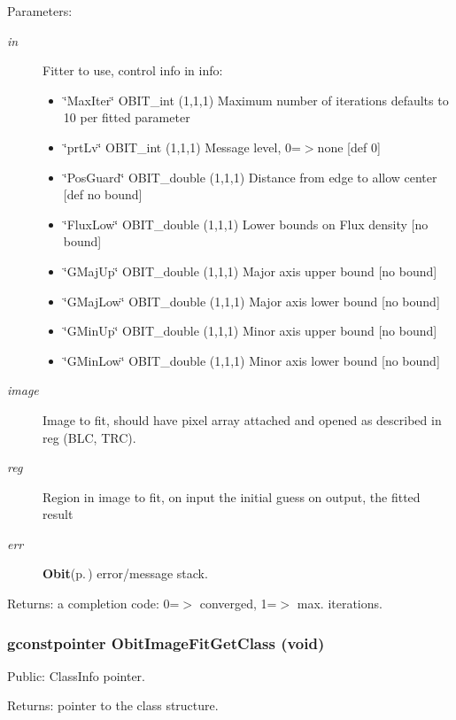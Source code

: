 \begin{Desc}
\item[Parameters:]
\begin{description}
\item[{\em in}]Fitter to use, control info in info: \begin{itemize}
\item \char`\"{}Max\-Iter\char`\"{} OBIT\_\-int (1,1,1) Maximum number of iterations defaults to 10 per fitted parameter \item \char`\"{}prt\-Lv\char`\"{} OBIT\_\-int (1,1,1) Message level, 0=$>$none [def 0] \item \char`\"{}Pos\-Guard\char`\"{} OBIT\_\-double (1,1,1) Distance from edge to allow center [def no bound] \item \char`\"{}Flux\-Low\char`\"{} OBIT\_\-double (1,1,1) Lower bounds on Flux density [no bound] \item \char`\"{}GMaj\-Up\char`\"{} OBIT\_\-double (1,1,1) Major axis upper bound [no bound] \item \char`\"{}GMaj\-Low\char`\"{} OBIT\_\-double (1,1,1) Major axis lower bound [no bound] \item \char`\"{}GMin\-Up\char`\"{} OBIT\_\-double (1,1,1) Minor axis upper bound [no bound] \item \char`\"{}GMin\-Low\char`\"{} OBIT\_\-double (1,1,1) Minor axis lower bound [no bound] \end{itemize}
\item[{\em image}]Image to fit, should have pixel array attached and opened as described in reg (BLC, TRC). \item[{\em reg}]Region in image to fit, on input the initial guess on output, the fitted result \item[{\em err}]{\bf Obit}{\rm (p.\,\pageref{structObit})} error/message stack. \end{description}
\end{Desc}
\begin{Desc}
\item[Returns:]a completion code: 0=$>$ converged, 1=$>$ max. iterations. \end{Desc}
\subsubsection{\setlength{\rightskip}{0pt plus 5cm}gconstpointer Obit\-Image\-Fit\-Get\-Class (void)}\label{ObitImageFit_8h_a9}


Public: Class\-Info pointer. 

\begin{Desc}
\item[Returns:]pointer to the class structure. \end{Desc}
